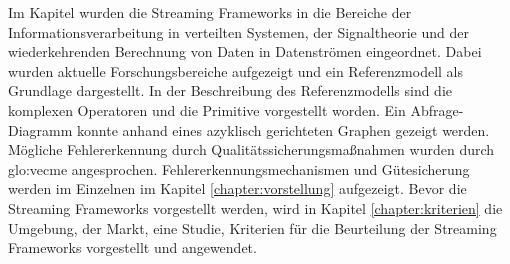 Im Kapitel  wurden die Streaming Frameworks in die Bereiche der Informationsverarbeitung in verteilten Systemen, der Signaltheorie und der wiederkehrenden Berechnung von Daten in Datenströmen eingeordnet. Dabei wurden aktuelle Forschungsbereiche aufgezeigt und ein Referenzmodell als Grundlage dargestellt. In der Beschreibung des Referenzmodells sind die komplexen Operatoren und die Primitive vorgestellt worden. Ein Abfrage-Diagramm konnte anhand eines azyklisch gerichteten Graphen gezeigt werden. Mögliche Fehlererkennung durch Qualitätssicherungsmaßnahmen wurden durch \acrlong{glo:vecme} angesprochen. Fehlererkennungsmechanismen und Gütesicherung werden im Einzelnen im Kapitel \ref{chapter:vorstellung} aufgezeigt. Bevor die Streaming Frameworks vorgestellt werden, wird in Kapitel \ref{chapter:kriterien} die Umgebung, der Markt, eine Studie, Kriterien für die Beurteilung der Streaming Frameworks vorgestellt und angewendet.